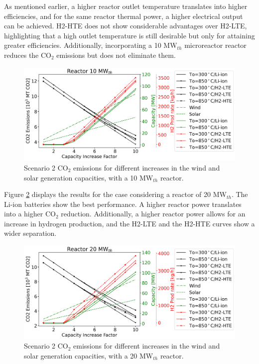 \documentclass{anstrans}
\begin{document}
As mentioned earlier, a higher reactor outlet temperature translates into higher efficiencies, and for the same reactor thermal power, a higher electrical output can be achieved.
H2-HTE does not show considerable advantages over H2-LTE, highlighting that a high outlet temperature is still desirable but only for attaining greater efficiencies.
Additionally, incorporating a 10 MW$_{th}$ microreactor reactor reduces the CO$_2$ emissions but does not eliminate them.

\begin{figure}[htbp!] %
    \centering
    \includegraphics[width=0.99\linewidth]{figures/scenario2-10-summer-emissions}
    \hfill
    \caption{Scenario 2 CO$_2$ emissions for different increases in the wind and solar generation capacities, with a 10 MW$_{th}$ reactor.}
    \label{fig:2-summer-10-emissions}
\end{figure}

Figure \ref{fig:2-summer-20-emissions} displays the results for the case considering a reactor of 20 MW$_{th}$.
The Li-ion batteries show the best performance.
A higher reactor power translates into a higher CO$_2$ reduction.
Additionally, a higher reactor power allows for an increase in hydrogen production, and the H2-LTE and the H2-HTE curves show a wider separation.

\begin{figure}[htbp!] %
    \centering
    \includegraphics[width=0.99\linewidth]{figures/scenario2-20-summer-emissions}
    \hfill
    \caption{Scenario 2 CO$_2$ emissions for different increases in the wind and solar generation capacities, with a 20 MW$_{th}$ reactor.}
    \label{fig:2-summer-20-emissions}
\end{figure}
\end{document}
